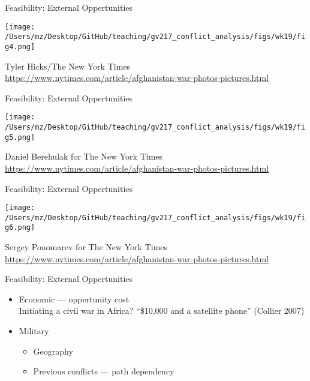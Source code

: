 \documentclass{beamer}
\begin{document}
\begin{frame}{Feasibility: External Oppertunities}
    \begin{center}
        \texttt{[image: /Users/mz/Desktop/GitHub/teaching/gv217\_conflict\_analysis/figs/wk19/fig4.png]}
    \end{center}
    \tiny Tyler Hicks/The New York Times\\ \url{https://www.nytimes.com/article/afghanistan-war-photos-pictures.html}
\end{frame}

\begin{frame}{Feasibility: External Oppertunities}
    \begin{center}
        \texttt{[image: /Users/mz/Desktop/GitHub/teaching/gv217\_conflict\_analysis/figs/wk19/fig5.png]}
    \end{center}
    \tiny Daniel Berehulak for The New York Times\\ \url{https://www.nytimes.com/article/afghanistan-war-photos-pictures.html}
\end{frame}

\begin{frame}{Feasibility: External Oppertunities}
    \begin{center}
        \texttt{[image: /Users/mz/Desktop/GitHub/teaching/gv217\_conflict\_analysis/figs/wk19/fig6.png]}
    \end{center}
    \tiny Sergey Ponomarev for The New York Times\\ \url{https://www.nytimes.com/article/afghanistan-war-photos-pictures.html}
\end{frame}

\begin{frame}{Feasibility: External Oppertunities}
    \begin{itemize}
        \item Economic --- oppertunity cost\\
              Initiating a civil war in Africa? ``\$10,000 and a satellite phone'' (Collier 2007)
        \item Military
        \begin{itemize}
            \item Geography
            \item Previous conflicts --- path dependency
        \end{itemize}
    \end{itemize}
\end{frame}
\end{document}
